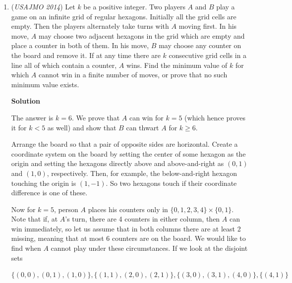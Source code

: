 \begin{enumerate}
 By induction we are done. Because each Class $k$ for integral $k$ at least $0$ misses at least one $S$ value, we miss an infinite number of numbers. Game over! 

 Note: If you are unconvinced of the range of $S(n)$ values we go from the smallest value of both the number and the $s_b(n)$, or $b^k$ and $1$, to the greatest of both, i.e. $b^{k+1}-1$ and $k(b+1)$, because in that series the largest possible sum is a bunch of $b-1$s.

 


	\item (\textit{USAJMO 2014}) Let $k$ be a positive integer. Two players $A$ and $B$ play a game on an infinite grid of regular hexagons. Initially all the grid cells are empty. Then the players alternately take turns with $A$ moving first. In his move, $A$ may choose two adjacent hexagons in the grid which are empty and place a counter in both of them. In his move, $B$ may choose any counter on the board and remove it. If at any time there are $k$ consecutive grid cells in a line all of which contain a counter, $A$ wins. Find the minimum value of $k$ for which $A$ cannot win in a finite number of moves, or prove that no such minimum value exists.


 



\textbf{Solution}

The answer is $k=6$. We prove that $A$ can win for $k=5$ (which hence proves it for $k<5$ as well) and show that $B$ can thwart $A$ for $k\geq 6$.

 Arrange the board so that a pair of opposite sides are horizontal. Create a coordinate system on the board by setting the center of some hexagon as the origin and setting the hexagons directly above and above-and-right as $(0, 1)$ and $(1, 0)$, respectively. Then, for example, the below-and-right hexagon touching the origin is $(1, -1)$. So two hexagons touch if their coordinate difference is one of these.

 Now for $k=5$, person $A$ places his counters only in $\{0, 1, 2, 3, 4\}\times\{0, 1\}$. Note that if, at $A$'s turn, there are 4 counters in either column, then $A$ can win immediately, so let us assume that in both columns there are at least 2 missing, meaning that at most $6$ counters are on the board. We would like to find when $A$ cannot play under these circumstances. If we look at the disjoint sets

 $\{(0, 0), (0, 1), (1, 0)\}, \{(1, 1), (2, 0), (2, 1)\}, \{(3, 0), (3, 1), (4, 0)\}, \{(4, 1)\}$


\end{enumerate}
